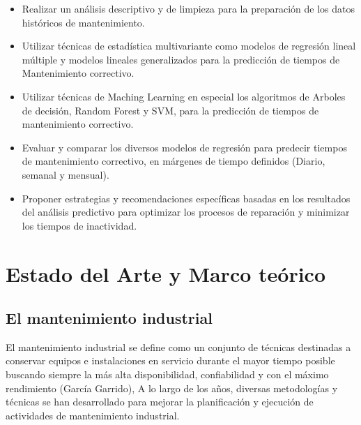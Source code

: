 \documentclass[
  11pt,
  bookmarksnumbered]{article}
\begin{document}
\begin{itemize}
\item
  Realizar un análisis descriptivo y de limpieza para la preparación de los datos históricos de mantenimiento.
\item
  Utilizar técnicas de estadística multivariante como modelos de regresión lineal múltiple y modelos lineales generalizados para la predicción de tiempos de Mantenimiento correctivo.
\item
  Utilizar técnicas de Maching Learning en especial los algoritmos de Arboles de decisión, Random Forest y SVM, para la predicción de tiempos de mantenimiento correctivo.
\item
  Evaluar y comparar los diversos modelos de regresión para predecir tiempos de mantenimiento correctivo, en márgenes de tiempo definidos (Diario, semanal y mensual).
\item
  Proponer estrategias y recomendaciones específicas basadas en los resultados del análisis predictivo para optimizar los procesos de reparación y minimizar los tiempos de inactividad.
\end{itemize}

\newpage

\hypertarget{estado-del-arte-y-marco-teuxf3rico}{%
\section{Estado del Arte y Marco teórico}\label{estado-del-arte-y-marco-teuxf3rico}}

\hypertarget{el-mantenimiento-industrial}{%
\subsection{El mantenimiento industrial}\label{el-mantenimiento-industrial}}

El mantenimiento industrial se define como un conjunto de técnicas destinadas a conservar equipos e instalaciones en servicio durante el mayor tiempo posible buscando siempre la más alta disponibilidad, confiabilidad y con el máximo rendimiento (García Garrido), A lo largo de los años, diversas metodologías y técnicas se han desarrollado para mejorar la planificación y ejecución de actividades de mantenimiento industrial.
\end{document}
